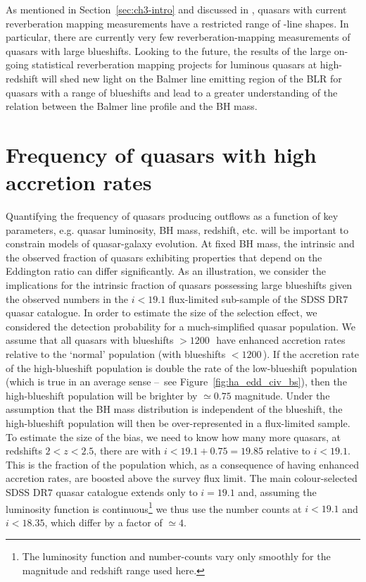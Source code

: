 As mentioned in Section~\ref{sec:ch3-intro} and discussed in \citet{richards11}, quasars with current reverberation mapping measurements have a restricted range of -line shapes. 
In particular, there are currently very few reverberation-mapping measurements of quasars with large  blueshifts. 
Looking to the future, the results of the large on-going statistical reverberation mapping projects \citep[e.g.][]{shen15,kingoz15} for luminous quasars at high-redshift will shed new light on the Balmer line emitting region of the BLR for quasars with a range of  blueshifts and lead to a greater understanding of the relation between the Balmer line profile and the BH mass.


\section{Frequency of quasars with high accretion rates}

Quantifying the frequency of quasars producing outflows as a function of key parameters, e.g. quasar luminosity, BH mass, redshift, etc. will be important to constrain models of quasar-galaxy evolution.  
At fixed BH mass, the intrinsic and the observed fraction of quasars exhibiting properties that depend on the Eddington ratio can differ significantly. 
As an illustration, we consider the implications for the intrinsic fraction of quasars possessing large  blueshifts given the observed numbers in the $i<19.1$ flux-limited sub-sample of the SDSS DR$7$ quasar catalogue. 
In order to estimate the size of the selection effect, we considered the detection probability for a much-simplified quasar population. 
We assume that all quasars with  blueshifts $>1200$\,\kms\, have enhanced accretion rates relative to the `normal' population (with  blueshifts $<1200$\,\kms). 
If the accretion rate of the high-blueshift population is double the rate of the low-blueshift population (which is true in an average sense \---\ see Figure~\ref{fig:ha_edd_civ_bs}), then the high-blueshift population will be brighter by $\simeq0.75$ magnitude.
Under the assumption that the BH mass distribution is independent of the  blueshift, the high-blueshift population will then be over-represented in a flux-limited sample.
To estimate the size of the bias, we need to know how many more quasars, at redshifts $2 < z < 2.5$, there are with $i<19.1+0.75=19.85$ relative to $i < 19.1$.
This is the fraction of the population which, as a consequence of having enhanced accretion rates, are boosted above the survey flux limit.    
The main colour-selected SDSS DR$7$ quasar catalogue extends only to $i= 19.1$ and, assuming the luminosity function is continuous\footnote{The luminosity function and number-counts vary only smoothly \citep[e.g.][]{ross13} for the magnitude and redshift range used here.} we thus use the number counts at $i < 19.1$ and $i < 18.35$, which differ by a factor of $\simeq 4$. 

